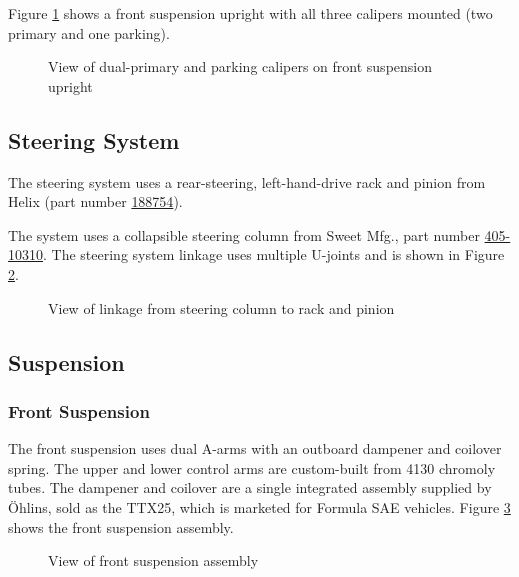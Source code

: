 \documentclass[10pt]{article}
\begin{document}
Figure \ref{fig:calipers-mounting-geometry} shows a front suspension upright with all three calipers mounted (two primary and one parking).

\begin{figure}
\centering
\caption{View of dual-primary and parking calipers on front suspension upright }
\label{fig:calipers-mounting-geometry}
\end{figure}

\subsection{Steering System}
The steering system uses a rear-steering, left-hand-drive rack and pinion from Helix (part number \href{http://www.helixsuspension.com/catalog/Steering/Manual-Steering-Racks/HEXSR5/Omni-Manual-Steering-Rack---Rear-Steering}{188754}). 

The system uses a collapsible steering column from Sweet Mfg.\@, part number \href{https://sweetmfg.biz/product.php?productid=2836}{405-10310}. The steering system linkage uses multiple U-joints and is shown in Figure \ref{fig:steering-system}.

\begin{figure}
\centering
\caption{View of linkage from steering column to rack and pinion}
\label{fig:steering-system}
\end{figure}

\subsection{Suspension}
\subsubsection{Front Suspension}
The front suspension uses dual A-arms with an outboard dampener and coilover spring. The upper and lower control arms are custom-built from 4130 chromoly tubes. The dampener and coilover are a single integrated assembly supplied by \"Ohlins, sold as the TTX25, which is marketed for Formula SAE vehicles. Figure \ref{fig:front-suspension} shows the front suspension assembly.

\begin{figure}
\centering
\caption{View of front suspension assembly}
\label{fig:front-suspension}
\end{figure}
\end{document}
